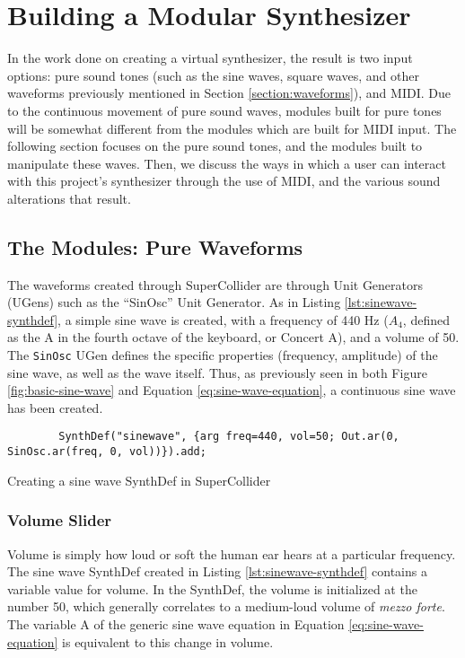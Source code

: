 \chapter{Building a Modular Synthesizer}\label{chapter:building-a-mod-synth}

In the work done on creating a virtual synthesizer, the result is two input options: pure sound tones (such as the sine waves, square waves, and other waveforms previously mentioned in Section \ref{section:waveforms}), and MIDI. Due to the continuous movement of pure sound waves, modules built for pure tones will be somewhat different from the modules which are built for MIDI input. The following section focuses on the pure sound tones, and the modules built to manipulate these waves. Then, we discuss the ways in which a user can interact with this project's synthesizer through the use of MIDI, and the various sound alterations that result.

\section{The Modules: Pure Waveforms}

The waveforms created through SuperCollider are through Unit Generators (UGens) such as the ``SinOsc'' Unit Generator. As in Listing \ref{lst:sinewave-synthdef}, a simple sine wave is created, with a frequency of 440 Hz ($A_4$, defined as the A in the fourth octave of the keyboard, or Concert A), and a volume of 50. The \texttt{SinOsc} UGen defines the specific properties (frequency, amplitude) of the sine wave, as well as the wave itself. Thus, as previously seen in both Figure \ref{fig:basic-sine-wave} and Equation \ref{eq:sine-wave-equation}, a continuous sine wave has been created.

\begin{listing}
	\begin{lstlisting}
		SynthDef("sinewave", {arg freq=440, vol=50; Out.ar(0, SinOsc.ar(freq, 0, vol))}).add;
	\end{lstlisting}
	\caption{Creating a sine wave SynthDef in SuperCollider}
	\label{lst:sinewave-synthdef}
\end{listing}

\subsection{Volume Slider}
Volume is simply how loud or soft the human ear hears at a particular frequency. The sine wave SynthDef created in Listing \ref{lst:sinewave-synthdef} contains a variable value for volume. In the SynthDef, the volume is initialized at the number 50, which generally correlates to a medium-loud volume of \textit{mezzo forte}. The variable A of the generic sine wave equation in Equation \ref{eq:sine-wave-equation} is equivalent to this change in volume.

